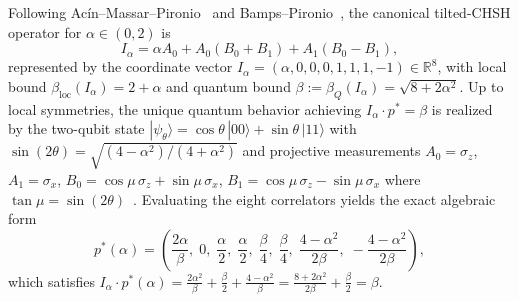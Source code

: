 \documentclass[11pt,a4paper]{article}
\newcommand{\RR}{\mathbb{R}}
\begin{document}
Following Ac\'in--Massar--Pironio~\cite{acin2012randomness} and Bamps--Pironio~\cite{bamps2015sos}, the canonical tilted-CHSH operator for $\alpha \in (0,2)$ is
\begin{equation}
  I_\alpha = \alpha A_0 + A_0(B_0 + B_1) + A_1(B_0 - B_1),
\end{equation}
represented by the coordinate vector $I_\alpha = (\alpha, 0, 0, 0, 1, 1, 1, -1) \in \RR^8$, with local bound $\beta_{\mathrm{loc}}(I_\alpha) = 2 + \alpha$ and quantum bound $\beta := \beta_Q(I_\alpha) = \sqrt{8 + 2\alpha^2}$.
Up to local symmetries, the unique quantum behavior achieving $I_\alpha \cdot p^* = \beta$ is realized by the two-qubit state $|\psi_\theta\rangle = \cos\theta\,|00\rangle + \sin\theta\,|11\rangle$ with $\sin(2\theta) = \sqrt{(4-\alpha^2)/(4+\alpha^2)}$ and projective measurements $A_0 = \sigma_z$, $A_1 = \sigma_x$, $B_0 = \cos\mu\,\sigma_z + \sin\mu\,\sigma_x$, $B_1 = \cos\mu\,\sigma_z - \sin\mu\,\sigma_x$ where $\tan\mu = \sin(2\theta)$~\cite{bamps2015sos,wu2026normalcone}.
Evaluating the eight correlators yields the exact algebraic form
\begin{equation}
  p^*(\alpha) = \left(\frac{2\alpha}{\beta},\; 0,\; \frac{\alpha}{2},\; \frac{\alpha}{2},\; \frac{\beta}{4},\; \frac{\beta}{4},\; \frac{4-\alpha^2}{2\beta},\; -\frac{4-\alpha^2}{2\beta}\right),
  \label{eq:pstar}
\end{equation}
which satisfies $I_\alpha \cdot p^*(\alpha) = \frac{2\alpha^2}{\beta} + \frac{\beta}{2} + \frac{4-\alpha^2}{\beta} = \frac{8+2\alpha^2}{2\beta} + \frac{\beta}{2} = \beta$.
\end{document}
